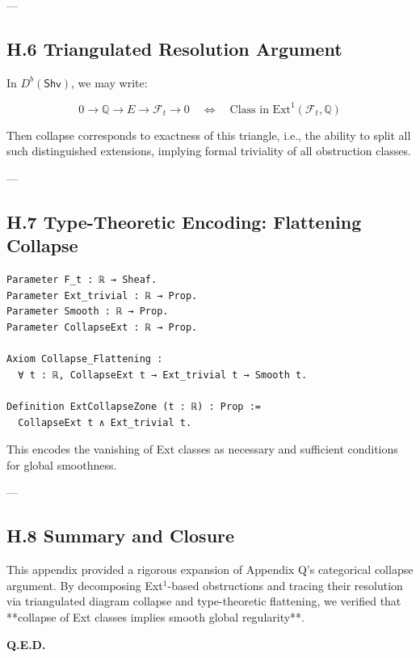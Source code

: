 \documentclass[11pt]{article}
\begin{document}
{{---

\subsection*{H.6 Triangulated Resolution Argument}

In \( D^b(\mathsf{Shv}) \), we may write:

\[
0 \to \mathbb{Q} \to E \to \mathcal{F}_t \to 0
\quad \Leftrightarrow \quad \text{Class in } \mathrm{Ext}^1(\mathcal{F}_t, \mathbb{Q})
\]

Then collapse corresponds to exactness of this triangle, i.e.,  
the ability to split all such distinguished extensions,  
implying formal triviality of all obstruction classes.

---

\subsection*{H.7 Type-Theoretic Encoding: Flattening Collapse}

\begin{lstlisting}[language=Coq, caption=Ext-Class Collapse Type Encoding]
Parameter F_t : ℝ → Sheaf.
Parameter Ext_trivial : ℝ → Prop.
Parameter Smooth : ℝ → Prop.
Parameter CollapseExt : ℝ → Prop.

Axiom Collapse_Flattening :
  ∀ t : ℝ, CollapseExt t → Ext_trivial t → Smooth t.

Definition ExtCollapseZone (t : ℝ) : Prop :=
  CollapseExt t ∧ Ext_trivial t.
\end{lstlisting}

This encodes the vanishing of Ext classes as necessary and sufficient conditions for global smoothness.

---

\subsection*{H.8 Summary and Closure}

This appendix provided a rigorous expansion of Appendix Q’s categorical collapse argument.  
By decomposing Ext\(^1\)-based obstructions and tracing their resolution via  
triangulated diagram collapse and type-theoretic flattening,  
we verified that **collapse of Ext classes implies smooth global regularity**.

\begin{flushright}
\textbf{Q.E.D.}
\end{flushright}


}}
\end{document}
